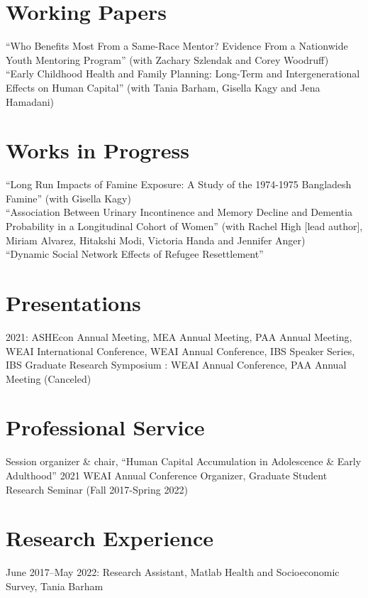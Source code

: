 \documentclass[letterpaper]{article}
\begin{document}
\section*{Working Papers}
``Who Benefits Most From a Same-Race Mentor? Evidence From a Nationwide Youth Mentoring Program'' (with Zachary Szlendak and Corey Woodruff) 
\\[.5em]
``Early Childhood Health and Family Planning: Long-Term and Intergenerational Effects on Human Capital'' (with Tania Barham, Gisella Kagy and Jena Hamadani)

\section*{Works in Progress}
``Long Run Impacts of Famine Exposure: A Study of the 1974-1975 Bangladesh Famine'' (with Gisella Kagy)
\\[.5em]
``Association Between Urinary Incontinence and Memory Decline and Dementia Probability in a Longitudinal Cohort of Women'' (with Rachel High [lead author], Miriam Alvarez, Hitakshi Modi, Victoria Handa and Jennifer Anger)
\\[.5em]
``Dynamic Social Network Effects of Refugee Resettlement''

\section*{Presentations}
2021: ASHEcon Annual Meeting, MEA Annual Meeting, PAA Annual Meeting, WEAI International Conference, WEAI Annual Conference, IBS Speaker Series, IBS Graduate Research Symposium
\newline{}: WEAI Annual Conference, PAA Annual Meeting (Canceled)

\section*{Professional Service}
Session organizer \& chair, ``Human Capital Accumulation in Adolescence \& Early Adulthood'' 2021 WEAI Annual Conference 
\newline\newline
Organizer, Graduate Student Research Seminar (Fall 2017-Spring 2022)

\section*{Research Experience}
June 2017--May 2022: Research Assistant, Matlab Health and Socioeconomic Survey, Tania Barham
\end{document}
